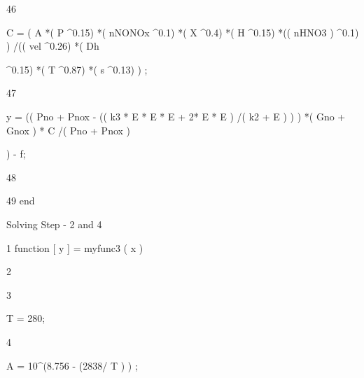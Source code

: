 \documentclass[a4paper,portrait,12pt]{article}
\begin{document}
46





\begin{flushleft}
C = ( A *( P \^{}0.15) *( nNONOx \^{}0.1) *( X \^{}0.4) *( H \^{}0.15) *(( nHNO3 ) \^{}0.1) ) /(( vel \^{}0.26) *( Dh
\end{flushleft}


\begin{flushleft}
\^{}0.15) *( T \^{}0.87) *( s \^{}0.13) ) ;
\end{flushleft}





47





\begin{flushleft}
y = (( Pno + Pnox - (( k3 * E * E * E + 2* E * E ) /( k2 + E ) ) ) *( Gno + Gnox ) * C /( Pno + Pnox )
\end{flushleft}


\begin{flushleft}
) - f;
\end{flushleft}





48


\begin{flushleft}
49 end
\end{flushleft}





\begin{flushleft}
Solving Step - 2 and 4
\end{flushleft}


\begin{flushleft}
1 function [ y ] = myfunc3 ( x )
\end{flushleft}


2


3





\begin{flushleft}
T = 280;
\end{flushleft}





4





\begin{flushleft}
A = 10\^{}(8.756 - (2838/ T ) ) ;
\end{flushleft}
\end{document}
